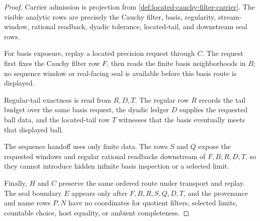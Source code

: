 \begin{proof}
Carrier admission is projection from \autoref{def:located-cauchy-filter-carrier}. The visible analytic rows are precisely the Cauchy filter, basis, regularity, stream-window, rational readback, dyadic tolerance, located-tail, and downstream seal rows.

For basis exposure, replay a located precision request through $C$. The request first fixes the Cauchy filter row $F$, then reads the finite basis neighborhoods in $B$; no sequence window or real-facing seal is available before this basis route is displayed.

Regular-tail exactness is read from $R,D,T$. The regular row $R$ records the tail budget over the same basis request, the dyadic ledger $D$ supplies the requested ball data, and the located-tail row $T$ witnesses that the basis eventually meets that displayed ball.

The sequence handoff uses only finite data. The rows $S$ and $Q$ expose the requested windows and regular rational readbacks downstream of $F,B,R,D,T$, so they cannot introduce hidden infinite basis inspection or a selected limit.

Finally, $H$ and $C$ preserve the same ordered route under transport and replay. The seal boundary $E$ appears only after $F,B,R,S,Q,D,T$, and the provenance and name rows $P,N$ have no coordinates for quotient filters, selected limits, countable choice, host equality, or ambient completeness.
\end{proof}

